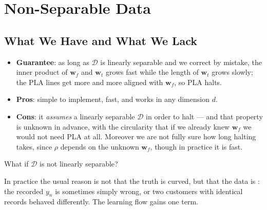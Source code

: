 \section{Non-Separable Data}\label{sec:nonsep}


\subsection{What We Have and What We Lack}

\begin{itemize}
    \item \textbf{Guarantee}: as long as \(\mathcal{D}\) is linearly separable
        and we correct by mistake, the inner product of \(\bm{w}_f\) and
        \(\bm{w}_t\) grows fast while the length of \(\bm{w}_t\) grows slowly;
        the PLA lines get more and more aligned with \(\bm{w}_f\), so PLA halts.
    \item \textbf{Pros}: simple to implement, fast, and works in any dimension
        \(d\).
    \item \textbf{Cons}: it \emph{assumes} a linearly separable \(\mathcal{D}\)
        in order to halt --- and that property is unknown in advance, with the
        circularity that if we already knew \(\bm{w}_f\) we would not need PLA
        at all. Moreover we are not fully sure how long halting takes, since
        \(\rho\) depends on the unknown \(\bm{w}_f\), though in practice it is
        fast.
\end{itemize}

\begin{question}
    What if \(\mathcal{D}\) is not linearly separable?
\end{question}

In practice the usual reason is not that the truth is curved, but that the data is : the
recorded \(y_n\) is sometimes simply wrong, or two customers with identical
records behaved differently. The learning flow gains one term.

